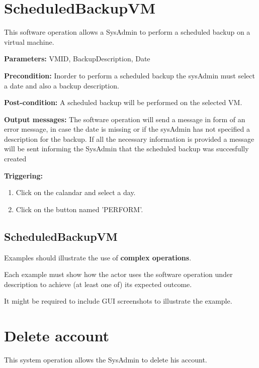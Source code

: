 \section{ScheduledBackupVM}
\label{operation:ScheduledBackupVM}
This software operation allows a SysAdmin to perform a scheduled backup on a
virtual machine.
\begin{description}

\item \textbf{Parameters:} VMID, BackupDescription, Date
\item \textbf{Precondition:} Inorder to perform a scheduled backup the sysAdmin 
must select a date and also a backup description.
\item \textbf{Post-condition:} A scheduled backup will be performed on the
selected VM.
\item \textbf{Output messages:} The software operation will send a message in
form of an error message, in case the date is missing or if the sysAdmin has 
not specified a description for the backup. If all the necessary information
is provided a message will be sent informing the SysAdmin that the scheduled 
backup was succesfully created


\item \textbf{Triggering:}
\begin{enumerate}
\item Click on the calandar and select a day.
\item Click on the button named 'PERFORM'.
\end{enumerate}

 
\end{description}


\subsection{ScheduledBackupVM}
Examples should illustrate the use of \textbf{complex operations}.

Each example must show how the actor uses the software operation under
description to achieve (at least one of) its expected outcome.

It might be required to include GUI screenshots to illustrate the example.



\section{Delete account}
\label{operation:deletAccount}
This system operation allows the SysAdmin to delete his account.

